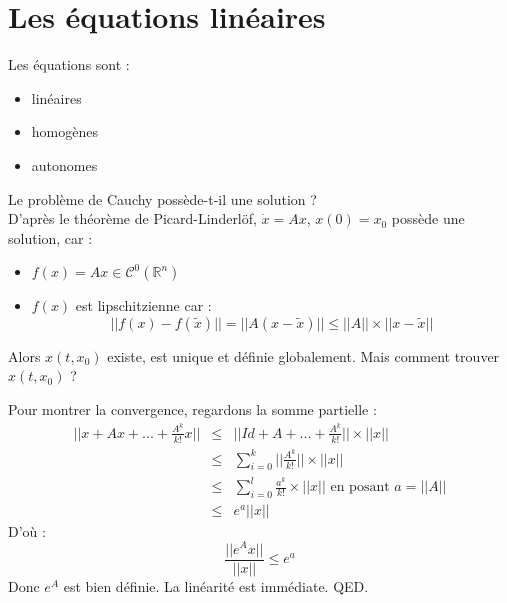 \part{Les équations linéaires}


Les équations sont :
\begin{itemize}
	\item linéaires
	\item homogènes
	\item autonomes
\end{itemize}

\bigskip
Le problème de Cauchy possède-t-il une solution ?\\
D'après le théorème de Picard-Linderlöf, $\dot{x}=Ax$, $x(0)=x_0$ possède une solution, car : 
\begin{itemize}
	\item $f(x)=Ax\in\mathcal{C}^0(\mathbb{R}^n)$
	\item $f(x)$ est lipschitzienne car : \[||f(x)-f(\tilde{x})||=||A(x-\tilde{x})||\leq ||A||\times||x-\tilde{x}||\]
\end{itemize}

Alors $x(t,x_0)$ existe, est unique et définie globalement. Mais comment trouver $x(t,x_0)$ ?



\begin{dem}
Pour montrer la convergence, regardons la somme partielle : 
\begin{eqnarray*}
	||x+Ax+...+\frac{A^k}{k!}x||&\leq&||Id+A+...+\frac{A^k}{k!}||\times||x|| \\
				     &\leq&\sum_{i=0}^k ||\frac{A^k}{k!}||\times ||x|| \\
		       		     &\leq& \sum_{i=0}^l \frac{a^k}{k!} \times ||x|| \text{ en posant } a=||A||\\
				     &\leq& e^a ||x||
\end{eqnarray*}
D'où : \[\frac{||e^Ax||}{||x||}\leq e^a\]
Donc $e^A$ est bien définie. La linéarité est immédiate. QED.
\end{dem}

